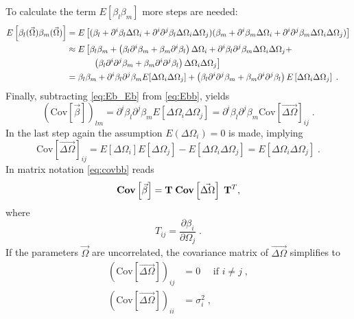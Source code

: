 To calculate the term $ {E}[{\beta_l}{\beta_m}] $ more steps are needed:
%
\begin{align}
E\left[\beta_l(\vec{\Omega})\beta_m(\vec{\Omega})\right]& = 
E\left[
	(
		\beta_l + \partial^i\beta_l\Delta\Omega_i + \partial^i\partial^j\beta_l\Delta\Omega_i\Delta\Omega_j
	)
	(
		\beta_m + \partial^i\beta_m\Delta\Omega_i + \partial^i\partial^j\beta_m\Delta\Omega_i\Delta\Omega_j
	)
\right] \notag \\
&\approx E\left[
	\beta_l\beta_m + 
	\left(\beta_l\partial^i\beta_m + \beta_m\partial^i\beta_l\right)\Delta\Omega_i +
	\partial^i\beta_l\partial^j\beta_m\Delta\Omega_i\Delta\Omega_j +\right. \notag\\ &\left.\quad\quad\quad
	\left(\beta_l\partial^i\partial^j\beta_m +\beta_m\partial^i\partial^j\beta_l\right)\Delta\Omega_i\Delta\Omega_j
\right] \notag\\
&= 	
	\beta_l\beta_m + 
	\partial^i\beta_l\partial^j\beta_mE[\Delta\Omega_i\Delta\Omega_j]+
	\left(\beta_l\partial^i\partial^j\beta_m +
	\beta_m\partial^i\partial^j\beta_l\right) E\left[\Delta\Omega_i\Delta\Omega_j \right]\;.
	\label{eq:Ebb}
\end{align}
%
Finally, subtracting \eqref{eq:Eb_Eb} from \eqref{eq:Ebb}, yields
%
\begin{equation}
(\text{Cov}[\vec{\beta}])_{lm} = \partial^i\beta_l\partial^j\beta_mE[\Delta\Omega_i\Delta\Omega_j] = \partial^i\beta_l\partial^j\beta_m \text{Cov}[\vec{\Delta\Omega}]_{ij}\;.
\label{eq:covbb}
\end{equation}
%
In the last step again the assumption $ E(\Delta\Omega_i)=0 $ is made, implying
%
\begin{equation}\label{eq_cov}
\text{Cov}[\vec{\Delta\Omega}]_{ij} =  E\left[\Delta\Omega_i \right] E[\Delta\Omega_j ] -  E\left[\Delta\Omega_i\Delta\Omega_j \right] =  E\left[\Delta\Omega_i\Delta\Omega_j \right]\;.
\end{equation}
%
In matrix notation \eqref{eq:covbb} reads
%
\begin{equation}
\mathbf{Cov}\left[\vec{\beta}\right] = \mathbf{T}\; \mathbf{Cov}\left[\vec{\Delta\Omega}\right] \;\mathbf{T}^T,
\end{equation}
%
 where 
%
\begin{equation}
T_{ij} = \frac{\partial \beta_i}{\partial \Omega_j}\;.
\end{equation}
%
If the parameters $ \vec{\Omega} $ are uncorrelated, the covariance matrix of $\vec{ \Delta\Omega} $ simplifies to
%
\begin{align}
\left(\text{Cov}\left[\vec{\Delta\Omega}\right] \right)_{ij}&= 0 \quad  \text{ if } i\neq j \;,\\
 \left(\text{Cov}\left[\vec{\Delta\Omega}\right] \right)_{ii}&= \sigma_i^2\;,
\end{align}
